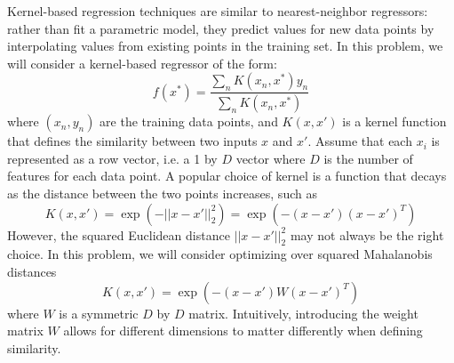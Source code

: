 \documentclass[submit]{harvardml}
\begin{document}
Kernel-based regression techniques are similar to nearest-neighbor
regressors: rather than fit a parametric model, they predict values
for new data points by interpolating values from existing points in
the training set.  In this problem, we will consider a kernel-based
regressor of the form:
\begin{equation*}
  f(x^*) = \frac{ \sum_{n} K(x_n,x^*) y_n  }{ \sum_{n} K(x_n,x^*) } 
\end{equation*}
where $(x_n,y_n)$ are the training data points, and $K(x,x')$ is a
kernel function that defines the similarity between two inputs $x$ and
$x'$. Assume that each $x_i$ is represented as a row vector, i.e. a
1 by $D$ vector where $D$ is the number of features for each data point. A popular choice of 
kernel is a function that decays as the distance between the two points increases, such as
\begin{equation*}
  K(x,x') = \exp(-||x-x'||^2_2) = \exp(-(x-x') (x-x')^T ) 
\end{equation*} 
However, the squared Euclidean distance $||x-x'||^2_2$ may not always
be the right choice.  In this problem, we will consider optimizing
over squared Mahalanobis distances
\begin{equation*}
  K(x,x') = \exp(-(x-x') W (x-x')^T ) 
  \label{eqn:distance}
\end{equation*} 
where $W$ is a symmetric $D$ by $D$ matrix.  Intuitively, introducing
the weight matrix $W$ allows for different dimensions to matter
differently when defining similarity.
\end{document}
